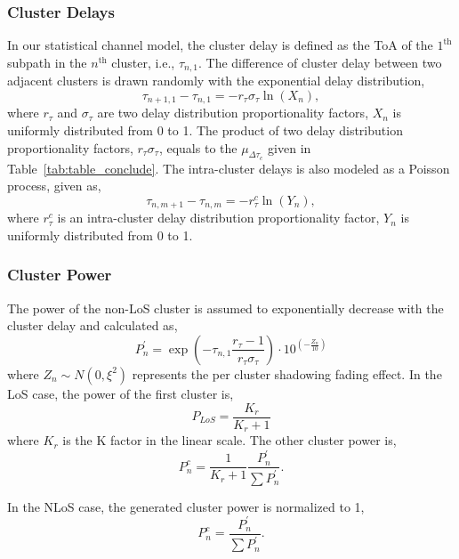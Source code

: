 \documentclass[journal,12pt,draftclsnofoot,onecolumn]{IEEEtran}
\begin{document}
\subsubsection{Cluster Delays}
In our statistical channel model, the cluster delay is defined as the ToA of the $1^{\mathrm{th}}$ subpath in the $n ^{\mathrm{th}}$ cluster, i.e., $\tau_{n,1}$. The difference of cluster delay between two adjacent clusters is drawn randomly with the exponential delay distribution,
\begin{equation}
    \tau_{n+1,1}-\tau_{n,1}=-r_\tau\sigma_\tau \ln(X_n),
\end{equation}
where $r_\tau$ and $\sigma_\tau$ are two delay distribution proportionality factors, $X_n$ is uniformly distributed from 0 to 1. The product of two delay distribution proportionality factors, $r_\tau\sigma_\tau$, equals to the $\mu_{\Delta \tau_c}$ given in Table~\ref{tab:table_conclude}. The intra-cluster delays is also modeled as a Poisson process, given as,
\begin{equation}
    \tau_{n,m+1}-\tau_{n,m}=-r^c_\tau \ln(Y_n),
\end{equation}
where $r^c_\tau$ is an intra-cluster delay distribution proportionality factor, $Y_n$ is uniformly distributed from 0 to 1.
\subsubsection{Cluster Power}
The power of the non-LoS cluster is assumed to exponentially decrease with the cluster delay and calculated as,
\begin{equation}
    P^\prime_n=\exp(-\tau_{n,1}\frac{r_\tau-1}{r_\tau\sigma_\tau})\cdot 10^{(-\frac{Z_n}{10})}
\end{equation} 
where $Z_n\sim N(0,\xi^2)$ represents the per cluster shadowing fading effect. In the LoS case, the power of the first cluster is,
\begin{equation}
    P_{LoS}=\frac{K_r}{K_r+1}
\end{equation}
where $K_r$ is the K factor in the linear scale. The other cluster power is,
\begin{equation}
    P^c_n=\frac{1}{K_r+1}\frac{P^\prime_n}{\sum P^\prime_n}.
\end{equation}
\par In the NLoS case, the generated cluster power is normalized to 1,
\begin{equation}
    P^c_n=\frac{P^\prime_n}{\sum P^\prime_n}.
\end{equation}
\end{document}

